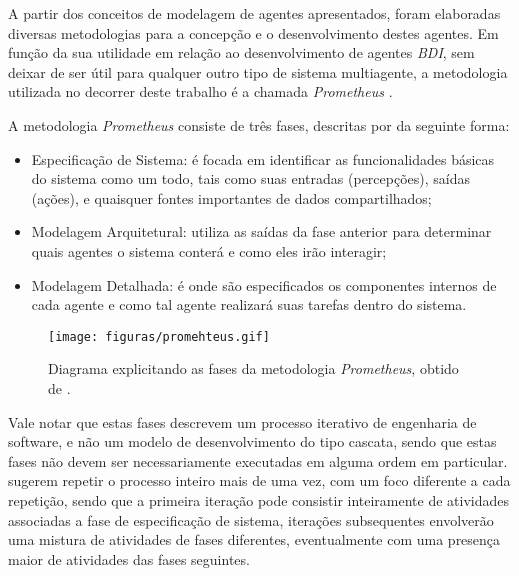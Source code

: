 A partir dos conceitos de modelagem de agentes apresentados, foram elaboradas diversas metodologias para a concepção e o desenvolvimento destes agentes. Em função da sua utilidade em relação ao desenvolvimento de agentes \emph{BDI}, sem deixar de ser útil para qualquer outro tipo de sistema multiagente, a metodologia utilizada no decorrer deste trabalho é a chamada \emph{Prometheus} \cite{prometheus}.

A metodologia \emph{Prometheus} consiste de três fases, descritas por  da seguinte forma:
\begin{itemize}
  \item Especificação de Sistema: é focada em identificar as funcionalidades básicas do sistema como um todo, tais como suas entradas (percepções), saídas (ações), e quaisquer fontes importantes de dados compartilhados;
  \item Modelagem Arquitetural: utiliza as saídas da fase anterior para determinar quais agentes o sistema conterá e como eles irão interagir;
  \item Modelagem Detalhada: é onde são especificados os componentes internos de cada agente e como tal agente realizará suas tarefas dentro do sistema.
\end{itemize}

\begin{figure}[!htb]
	\centering
	\caption{Diagrama explicitando as fases da metodologia \emph{Prometheus}, obtido de \cite{promeheus}.}\label{fig:promehteus}
	\texttt{[image: figuras/promehteus.gif]}
\end{figure}

Vale notar que estas fases descrevem um processo iterativo de engenharia de software, e não um modelo de desenvolvimento do tipo cascata, sendo que estas fases não devem ser necessariamente executadas em alguma ordem em particular.  sugerem repetir o processo inteiro mais de uma vez, com um foco diferente a cada repetição, sendo que a primeira iteração pode consistir inteiramente de atividades associadas a fase de especificação de sistema, iterações subsequentes envolverão uma mistura de atividades de fases diferentes, eventualmente com uma presença maior de atividades das fases seguintes. 
